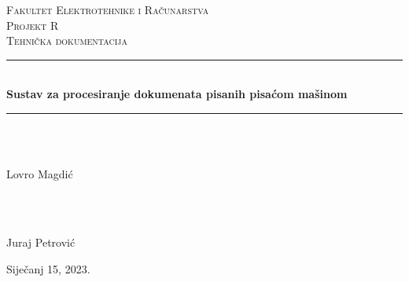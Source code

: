 \documentclass{article}
\begin{document}
\begin{titlepage}
	\newcommand{\HRule}{\rule{\linewidth}{0.5mm}} %
	
	\center %
	
	
	\textsc{\LARGE Fakultet Elektrotehnike i Računarstva}\\[1.5cm] %
	\vfill
	\textsc{\Large Projekt R}\\[0.5cm]
	\textsc{\large Tehnička dokumentacija}\\[0.5cm] %
	\HRule\\[0.4cm]
	{\huge\bfseries Sustav za procesiranje dokumenata pisanih pisaćom mašinom}\\[0.4cm] %
	
	\HRule\\[1.5cm]
	
	
	\begin{minipage}{0.4\textwidth}
		\begin{flushleft}
			\large
			\\
			Lovro Magdić
		\end{flushleft}
	\end{minipage}
	~
	\begin{minipage}{0.4\textwidth}
		\begin{flushright}
			\large
			\\
			Juraj Petrović
		\end{flushright}
	\end{minipage}
        \vfill\vfill\vfill\vfill\vfill\vfill\vfill\vfill\vfill
	{\large Siječanj 15, 2023.} %
	\vfill %
\end{titlepage}
\end{document}
